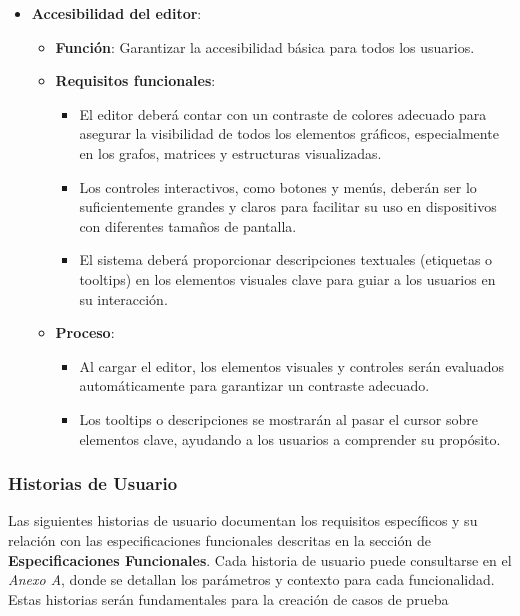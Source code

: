\documentclass[stu, 12pt, letterpaper, donotrepeattitle, floatsintext, natbib]{apa7}
\begin{document}
\begin{itemize}
    \begin{itemize}
        \item \textbf{Accesibilidad del editor}:
        \begin{itemize}
            \item \textbf{Función}: Garantizar la accesibilidad básica para todos los usuarios.
            \item \textbf{Requisitos funcionales}:
            \begin{itemize}
                \item El editor deberá contar con un contraste de colores adecuado para asegurar la visibilidad de todos los elementos gráficos, especialmente en los grafos, matrices y estructuras visualizadas.
                \item Los controles interactivos, como botones y menús, deberán ser lo suficientemente grandes y claros para facilitar su uso en dispositivos con diferentes tamaños de pantalla.
                \item El sistema deberá proporcionar descripciones textuales (etiquetas o tooltips) en los elementos visuales clave para guiar a los usuarios en su interacción.
            \end{itemize}
            \item \textbf{Proceso}:
            \begin{itemize}
                \item Al cargar el editor, los elementos visuales y controles serán evaluados automáticamente para garantizar un contraste adecuado.
                \item Los tooltips o descripciones se mostrarán al pasar el cursor sobre elementos clave, ayudando a los usuarios a comprender su propósito.
            \end{itemize}
        \end{itemize}
    \end{itemize}
   
\end{itemize}


\subsubsection{Historias de Usuario}

Las siguientes historias de usuario documentan los requisitos específicos y su relación con las especificaciones funcionales descritas en la sección de \textbf{Especificaciones Funcionales}. Cada historia de usuario puede consultarse en el \textit{Anexo A}, donde se detallan los parámetros y contexto para cada funcionalidad. Estas historias serán fundamentales para la creación de casos de prueba
\end{document}
